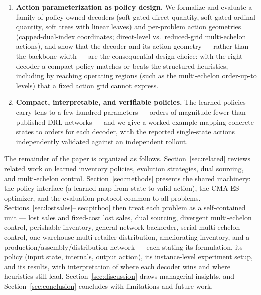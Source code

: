 \documentclass[11pt]{article}
\begin{document}
\begin{enumerate}
    ($+4.63\%$) and high-CV ten-retailer ($+7.16\%$) instances over six optimizer seeds, ties the
    strongly heterogeneous ten-retailer gate, and does not claim a robust PPO beat; on ameliorating inventory it raises long-run
    average profit far above the best order-up-to purchase policy while reporting the gap to the
    perfect-information LP as a bound; and on the production/assembly/distribution network a new residual
    base-stock-backbone action head upgrades the former heuristic-match on the mixed topology to a
    seed-robust $-2.20\%$ beat, while the serial and pure-assembly topologies are honest seed-noisy
    parity under a five-seed audit ($-2.2\%\pm3.0\%$ and $+2.1\%\pm5.0\%$; the earlier single-run
    beats there do not replicate). The mixed-topology residual head was found by a
    search over the decoder classes and scored by the same seed-robust heuristic comparison.
    \item \textbf{Action parameterization as policy design.} We formalize and evaluate a family of
    policy-owned decoders (soft-gated direct quantity, soft-gated ordinal quantity, soft trees with
    linear leaves) and per-problem action geometries (capped-dual-index coordinates; direct-level
    vs.\ reduced-grid multi-echelon actions), and show that the decoder and its action geometry --- rather
    than the backbone width --- are the consequential design choice: with the right decoder a compact
    policy matches or beats the structured heuristics, including by reaching operating regions (such as
    the multi-echelon order-up-to levels) that a fixed action grid cannot express.
    \item \textbf{Compact, interpretable, and verifiable policies.} The learned policies carry tens
    to a few hundred parameters --- orders of magnitude fewer than published DRL networks --- and we
    give a worked example mapping concrete states to orders for each decoder, with the reported
    single-state actions independently validated against an independent rollout.
\end{enumerate}

The remainder of the paper is organized as follows. Section~\ref{sec:related} reviews related work
on learned inventory policies, evolution strategies, dual sourcing, and multi-echelon control.
Section~\ref{sec:methods} presents the shared machinery: the policy interface (a learned map from
state to valid action), the CMA-ES optimizer, and the evaluation protocol common to all problems.
Sections~\ref{sec:lostsales}--\ref{sec:pirhoo} then treat each problem as a self-contained
unit --- lost sales and fixed-cost lost sales, dual sourcing, divergent multi-echelon control,
perishable inventory, general-network backorder, serial multi-echelon control, one-warehouse
multi-retailer distribution, ameliorating inventory, and a production/assembly/distribution
network --- each stating
its formulation, its policy (input state, internals, output action), its instance-level
experiment setup, and its results, with interpretation of where each decoder wins and where
heuristics still lead. Section~\ref{sec:discussion} draws managerial insights, and
Section~\ref{sec:conclusion} concludes with limitations and future work.
\end{document}
